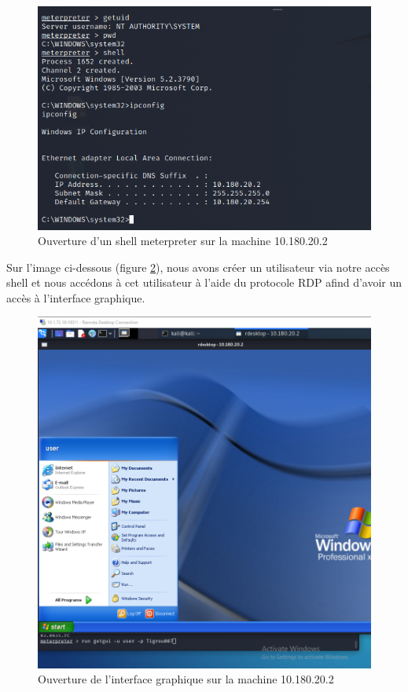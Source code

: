 \documentclass[french,paper=a4,oneside,captions=tableheading]{article}
\begin{document}
\begin{figure}[H]
    \centering
    \includegraphics[width=0.70\linewidth]{images/smb-exploit2.png}
    \caption{Ouverture d'un shell meterpreter sur la machine 10.180.20.2}
    \label{fig:smbexploit2}
\end{figure}

Sur l'image ci-dessous (figure \ref{fig:smbexploit3}), nous avons créer un utilisateur via notre accès shell et nous accédons à cet utilisateur à l'aide du protocole RDP afind d'avoir un accès à l'interface graphique.

\begin{figure}[H]
    \centering
    \includegraphics[width=0.80\linewidth]{images/smb-exploit3.png}
    \caption{Ouverture de l'interface graphique sur la machine 10.180.20.2}
    \label{fig:smbexploit3}
\end{figure}
\end{document}
